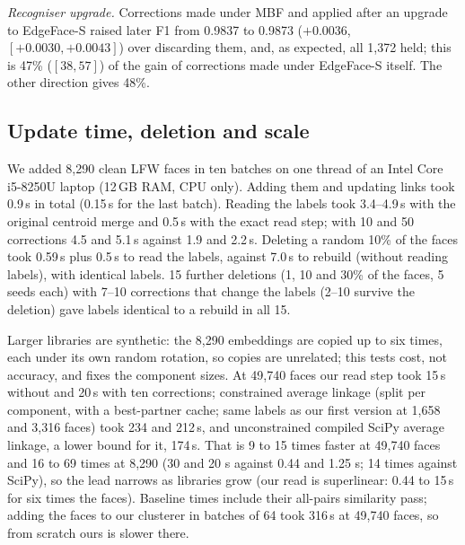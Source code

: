 \documentclass[conference]{IEEEtran}
\begin{document}
\emph{Recogniser upgrade.} Corrections made under MBF and applied after an upgrade to EdgeFace-S raised later F1 from
0.9837 to 0.9873 ($+0.0036$, $[+0.0030,+0.0043]$) over discarding them, and, as expected, all 1{,}372 held; this is 47\% ($[38,57]$) of
the gain of corrections made under EdgeFace-S itself. The other direction gives 48\%.

\subsection{Update time, deletion and scale}\label{sec:time}
We added 8{,}290 clean LFW faces in ten batches on one thread of an Intel Core i5-8250U laptop (12\,GB RAM, CPU only). Adding
them and updating links took 0.9\,s in total (0.15\,s for the last batch). Reading the labels took 3.4--4.9\,s with the original
centroid merge and 0.5\,s with the exact read step; with 10 and 50 corrections 4.5 and 5.1\,s against 1.9 and 2.2\,s. Deleting
a random 10\% of the faces took 0.59\,s plus 0.5\,s to read the labels, against 7.0\,s to rebuild (without reading labels), with identical labels. 15 further deletions (1, 10 and 30\% of the faces, 5 seeds each) with 7--10 corrections that change the labels (2--10 survive the deletion) gave labels identical to a rebuild in all 15.

Larger libraries are synthetic: the 8{,}290 embeddings are copied up to six times, each under its own random rotation, so
copies are unrelated; this tests cost, not accuracy, and fixes the component sizes. At 49{,}740 faces our read step took 15\,s without and 20\,s
with ten corrections; constrained average linkage (split per component, with a best-partner cache; same labels as our first version
at 1{,}658 and 3{,}316 faces) took 234 and 212\,s, and unconstrained compiled SciPy average linkage, a lower bound for it, 174\,s.
That is 9 to 15 times faster at 49{,}740 faces and 16 to 69 times at 8{,}290 (30 and 20 s against 0.44 and 1.25 s; 14 times against SciPy), so the lead
narrows as libraries grow (our read is superlinear: 0.44 to 15\,s for six times the faces). Baseline times include their all-pairs similarity pass;
adding the faces to our clusterer in batches of 64 took 316\,s at 49{,}740 faces, so from scratch ours is slower there.

\end{document}
